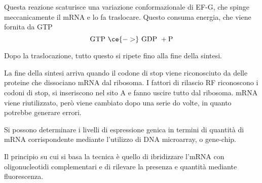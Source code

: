 Questa reazione scaturisce una variazione conformazionale di EF-G, che spinge meccanicamente il mRNA e lo fa traslocare. Questo consuma energia, che viene fornita da GTP
\[
\text{GTP } \ce{->} \text{ GDP } + \text{P}
\]

Dopo la traslocazione, tutto questo si ripete fino alla fine della sintesi.

La fine della sintesi arriva quando il codone di stop viene riconosciuto da delle proteine che dissociano mRNA dal ribosoma. I fattori di rilascio RF riconoscono i codoni di stop, si inseriscono nel sito A e fanno uscire tutto dal ribosoma. mRNA viene riutilizzato, però viene cambiato dopo una serie do volte, in quanto potrebbe generare errori.

Si possono determinare i livelli di espressione genica in termini di quantità di mRNA corrispondente mediante l'utilizzo di DNA microarray, o gene-chip.

Il principio su cui si basa la tecnica è quello di ibridizzare l'mRNA con oligonucleotidi complementari e di rilevare la presenza e quantità mediante fluorescenza.


